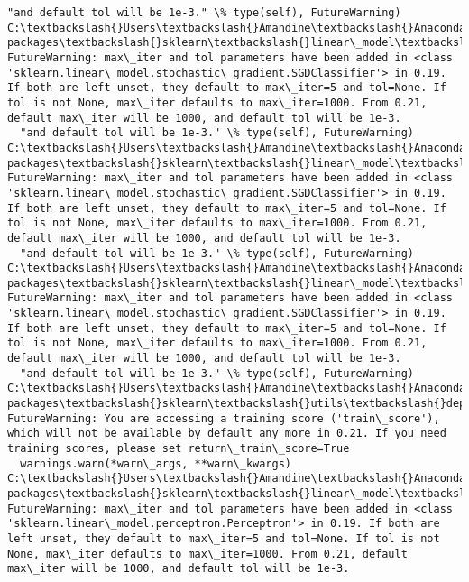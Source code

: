 \documentclass[11pt]{article}
\begin{document}
\begin{Verbatim}[commandchars=\\\{\}]
  "and default tol will be 1e-3." \% type(self), FutureWarning)
C:\textbackslash{}Users\textbackslash{}Amandine\textbackslash{}Anaconda3\textbackslash{}lib\textbackslash{}site-packages\textbackslash{}sklearn\textbackslash{}linear\_model\textbackslash{}stochastic\_gradient.py:128: FutureWarning: max\_iter and tol parameters have been added in <class 'sklearn.linear\_model.stochastic\_gradient.SGDClassifier'> in 0.19. If both are left unset, they default to max\_iter=5 and tol=None. If tol is not None, max\_iter defaults to max\_iter=1000. From 0.21, default max\_iter will be 1000, and default tol will be 1e-3.
  "and default tol will be 1e-3." \% type(self), FutureWarning)
C:\textbackslash{}Users\textbackslash{}Amandine\textbackslash{}Anaconda3\textbackslash{}lib\textbackslash{}site-packages\textbackslash{}sklearn\textbackslash{}linear\_model\textbackslash{}stochastic\_gradient.py:128: FutureWarning: max\_iter and tol parameters have been added in <class 'sklearn.linear\_model.stochastic\_gradient.SGDClassifier'> in 0.19. If both are left unset, they default to max\_iter=5 and tol=None. If tol is not None, max\_iter defaults to max\_iter=1000. From 0.21, default max\_iter will be 1000, and default tol will be 1e-3.
  "and default tol will be 1e-3." \% type(self), FutureWarning)
C:\textbackslash{}Users\textbackslash{}Amandine\textbackslash{}Anaconda3\textbackslash{}lib\textbackslash{}site-packages\textbackslash{}sklearn\textbackslash{}linear\_model\textbackslash{}stochastic\_gradient.py:128: FutureWarning: max\_iter and tol parameters have been added in <class 'sklearn.linear\_model.stochastic\_gradient.SGDClassifier'> in 0.19. If both are left unset, they default to max\_iter=5 and tol=None. If tol is not None, max\_iter defaults to max\_iter=1000. From 0.21, default max\_iter will be 1000, and default tol will be 1e-3.
  "and default tol will be 1e-3." \% type(self), FutureWarning)
C:\textbackslash{}Users\textbackslash{}Amandine\textbackslash{}Anaconda3\textbackslash{}lib\textbackslash{}site-packages\textbackslash{}sklearn\textbackslash{}utils\textbackslash{}deprecation.py:122: FutureWarning: You are accessing a training score ('train\_score'), which will not be available by default any more in 0.21. If you need training scores, please set return\_train\_score=True
  warnings.warn(*warn\_args, **warn\_kwargs)
C:\textbackslash{}Users\textbackslash{}Amandine\textbackslash{}Anaconda3\textbackslash{}lib\textbackslash{}site-packages\textbackslash{}sklearn\textbackslash{}linear\_model\textbackslash{}stochastic\_gradient.py:128: FutureWarning: max\_iter and tol parameters have been added in <class 'sklearn.linear\_model.perceptron.Perceptron'> in 0.19. If both are left unset, they default to max\_iter=5 and tol=None. If tol is not None, max\_iter defaults to max\_iter=1000. From 0.21, default max\_iter will be 1000, and default tol will be 1e-3.

\end{Verbatim}
\end{document}
